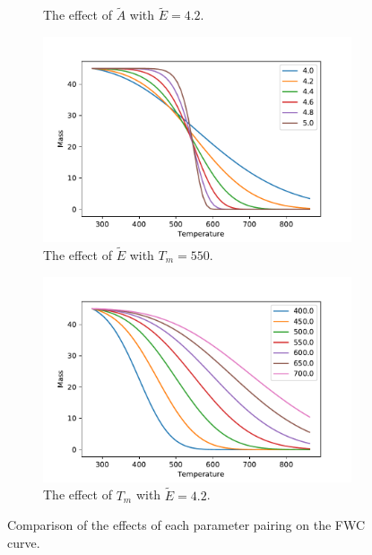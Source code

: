 \begin{figure}[h!]
\begin{subfigure}{.5\textwidth}
  \caption{The effect of $\tilde{A}$ with $\tilde{E}=4.2$.}
  \label{fig:subfwc_A_E}
\end{subfigure}
\newline
\begin{subfigure}{.5\textwidth}
  \centering
  \includegraphics[width=\linewidth]{figures/bayesian/1_reaction/E_fwc.pdf}
  \caption{The effect of $\tilde{E}$ with $T_m=550$.}
  \label{fig:subfwc_E_Tm}
\end{subfigure}%
\begin{subfigure}{.5\textwidth}
  \centering
  \includegraphics[width=\linewidth]{figures/bayesian/1_reaction/Tm_fwc.pdf}
  \caption{The effect of $T_m$ with $\tilde{E}=4.2$.}
  \label{fig:subfwc_Tm_E}
\end{subfigure}
    \caption{Comparison of the effects of each parameter pairing on the FWC curve.}%
    \label{fig:FWC_para_comp}%
\end{figure}%
